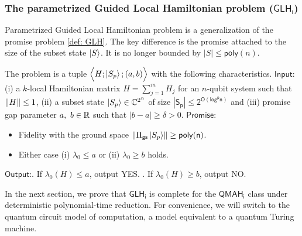 \documentclass[11pt]{article}
\newcommand{\ms}[1]{\mathsf{#1}}
\begin{document}
\subsubsection{The parametrized Guided Local Hamiltonian problem ($\ms{GLH_i}$)}
Parametrized Guided Local Hamiltonian problem is a generalization of the promise problem \ref{def: GLH}. The key difference is the promise attached to the size of the subset state $\ket{S}$. It is no longer bounded by $|S|\leq \ms{poly}(n)$.
\begin{prob}
    [$\ms{GLH_p}$ problem] The problem is a tuple $\Big\langle H; \ket{S_p};(a,b) \Big\rangle$ with the following characteristics. \newline
    $\ms{Input}$: (i) a $k$-local Hamiltonian matrix  $H=\sum_{j=1}^{m}H_j$ for an $n$-qubit system such that $\norm{H}\leq 1$, (ii) a subset state $\ket{S_p}\in \mathbb{C}^{2^n}$ of size  $\ms{|S_p|\leq 2^{O(log^p n)}}$ and (iii) promise gap parameter $a,\ b\in \mathbb{R}$ such that $|b-a|\geq \delta>0$. \newline
    $\ms{Promise}$:
    \begin{itemize}
        \item Fidelity with the ground space $\norm{\Pi_{\mathsf{gs}} \ket{S_p}}\geq \ms{poly(n)}$.
        \item Either case (i) $\lambda_0\leq a$ or (ii) $\lambda_0\geq b$ holds.
    \end{itemize}
    $\ms{Output}$:. If $\lambda_0(H) \leq a$, output YES. . If $\lambda_0(H) \geq b$, output NO.
    \label{def: GLH-i}
\end{prob}
In the next section, we prove that $\ms{GLH_i}$ is complete for the $\ms{QMAH_i}$ class under deterministic polynomial-time reduction. For convenience, we will switch to the quantum circuit model of computation, a model equivalent to a quantum Turing machine.
\end{document}

